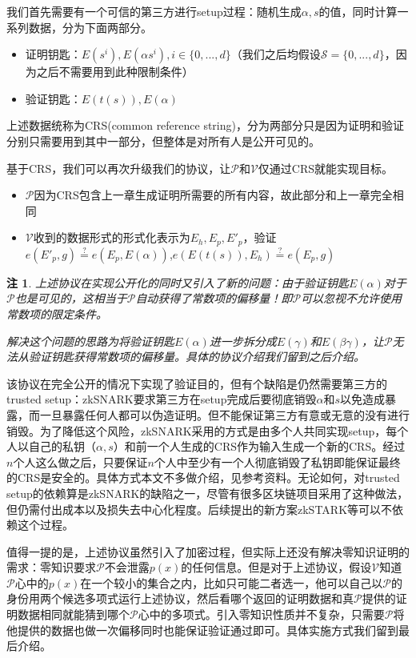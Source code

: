 \documentclass[12pt]{article}
\newcommand{\zk}{zkSNARK}
\newcommand{\ds}{\{0,...,d\}}
\newcommand{\pp}{$\mathcal{P}$}
\newcommand{\vv}{$\mathcal{V}$}
\newtheorem{remark}{注}[section]
\begin{document}
我们首先需要有一个可信的第三方进行setup过程：随机生成$\alpha,s$的值，同时计算一系列数据，分为下面两部分。
\begin{itemize}
	\item 证明钥匙：$E(s^i), E(\alpha s^i), i \in \ds $（我们之后均假设$\mathcal{S}=\ds$，因为之后不需要用到此种限制条件）
	\item 验证钥匙：$E(t(s)),E(\alpha)$
\end{itemize}
上述数据统称为CRS(common reference string)，分为两部分只是因为证明和验证分别只需要用到其中一部分，但整体是对所有人是公开可见的。

基于CRS，我们可以再次升级我们的协议，让\pp 和\vv 仅通过CRS就能实现目标。
\begin{itemize}
	\item \pp 因为CRS包含上一章生成证明所需要的所有内容，故此部分和上一章完全相同
	\item \vv 收到的数据形式的形式化表示为$E_h,E_p,E'_p$，验证\\$e(E'_p,g)\overset{?}{=} e(E_p,E(\alpha))$,$e(E(t(s)),E_h) \overset{?}{=} e(E_p,g)$
\end{itemize}
\begin{remark}
\label{shift}
	上述协议在实现公开化的同时又引入了新的问题：由于验证钥匙$E(\alpha)$对于\pp 也是可见的，这相当于\pp 自动获得了常数项的偏移量！即\pp 可以忽视不允许使用常数项的限定条件。
	
	解决这个问题的思路为将验证钥匙$E(\alpha)$进一步拆分成$E(\gamma)$和$E(\beta\gamma)$，让\pp 无法从验证钥匙获得常数项的偏移量。具体的协议介绍我们留到之后介绍。
\end{remark}
该协议在完全公开的情况下实现了验证目的，但有个缺陷是仍然需要第三方的trusted setup：\zk 要求第三方在setup完成后要彻底销毁$\alpha$和$s$以免造成暴露，而一旦暴露任何人都可以伪造证明。但不能保证第三方有意或无意的没有进行销毁。为了降低这个风险，\zk 采用的方式是由多个人共同实现setup，每个人以自己的私钥（$\alpha,s$）和前一个人生成的CRS作为输入生成一个新的CRS。经过$n$个人这么做之后，只要保证$n$个人中至少有一个人彻底销毁了私钥即能保证最终的CRS是安全的。具体方式本文不多做介绍，见参考资料。无论如何，对trusted setup的依赖算是\zk 的缺陷之一，尽管有很多区块链项目采用了这种做法，但仍需付出成本以及损失去中心化程度。后续提出的新方案zkSTARK等可以不依赖这个过程。

值得一提的是，上述协议虽然引入了加密过程，但实际上还没有解决零知识证明的需求：零知识要求\pp 不会泄露$p(x)$的任何信息。但是对于上述协议，假设\vv 知道\pp 心中的$p(x)$在一个较小的集合之内，比如只可能二者选一，他可以自己以\pp 的身份用两个候选多项式运行上述协议，然后看哪个返回的证明数据和真\pp 提供的证明数据相同就能猜到哪个\pp 心中的多项式。引入零知识性质并不复杂，只需要\pp 将他提供的数据也做一次偏移同时也能保证验证通过即可。具体实施方式我们留到最后介绍。
\end{document}
